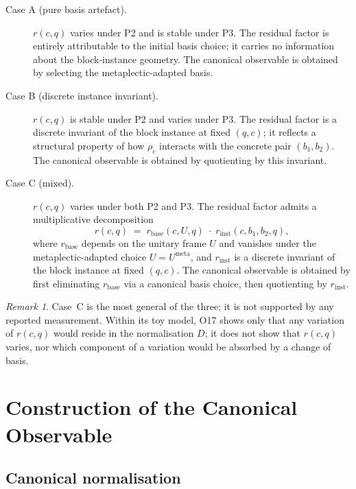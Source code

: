 \documentclass[11pt,a4paper]{article}
\theoremstyle{remark}
\newtheorem{remark}[theorem]{Remark}
\newcommand{\rcq}{r(c,q)}
\begin{document}
  \begin{description}
    \item[Case A (pure basis artefact).]
    $\rcq$ varies under P2 and is stable under P3.
    The residual factor is entirely attributable to the initial basis choice;
    it carries no information about the block-instance geometry.
    The canonical observable is obtained by selecting the metaplectic-adapted
    basis.
    \item[Case B (discrete instance invariant).]
    $\rcq$ is stable under P2 and varies under P3.
    The residual factor is a discrete invariant of the block instance at fixed
    $(q, c)$; it reflects a structural property of how $\rho_{c}$ interacts with
    the concrete pair $(b_{1}, b_{2})$.
    The canonical observable is obtained by quotienting by this invariant.
    \item[Case C (mixed).]
    $\rcq$ varies under both P2 and P3.
    The residual factor admits a multiplicative decomposition
    \begin{equation}
      \label{eq:r-decomp}
      \rcq \;=\; r_{\mathrm{base}}(c, U, q)\;\cdot\; r_{\mathrm{inst}}(c, b_{1}, b_{2}, q),
    \end{equation}
    where $r_{\mathrm{base}}$ depends on the unitary frame $U$ and vanishes under the
    metaplectic-adapted choice $U = U^{\mathrm{meta}}$, and $r_{\mathrm{inst}}$ is a
    discrete invariant of the block instance at fixed $(q, c)$.
    The canonical observable is obtained by first eliminating $r_{\mathrm{base}}$ via
    a canonical basis choice, then quotienting by $r_{\mathrm{inst}}$.
  \end{description}

  \begin{remark}
    Case~C is the most general of the three; it is not supported by any reported
    measurement.
    Within its toy model, O17 shows only that any variation of $\rcq$ would reside in the
    normalisation $D$; it does not show that $\rcq$ varies, nor which component of a variation
    would be absorbed by a change of basis.
  \end{remark}

  \section{Construction of the Canonical Observable}
  \label{sec:canonical}

  \subsection{Canonical normalisation}
\end{document}
